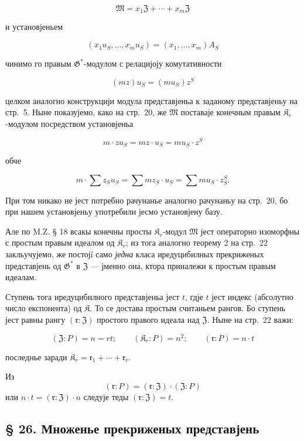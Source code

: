 \documentclass[11pt]{article}
\begin{document}
\[\mathfrak{M}=x_1\mathfrak{Z}+\cdots+x_m\mathfrak{Z}\]

и установјеньем

\[(x_1u_S,\ldots,x_mu_S)=(x_1,\ldots,x_m)A_S\]

чинимо го правым \(\mathfrak G^*\)-модулом с релацијоју комутативности

\[(mz) u_S = (mu_S) z^S\]

целком аналогно конструкцији модула представјеньа к заданому представјеньу на стр.~5. Ныне показујемо, како на стр.~20, же \(\mathfrak{M}\) поставаје конечным правым \(\mathfrak K_r\)-модулом посредством установјеньа

\[m \cdot z u_S = mz \cdot u_S = mu_S \cdot z^S\]

обче

\[m \cdot \sum z_S u_S = \sum m z_S \cdot u_S = \sum m u_S \cdot z_S^S.\]

При том никако не јест потребно рачунанье аналогно рачунаньу на стр.~20, бо при нашем установјеньу употребили јесмо установјену базу.

Але по M.Z. § 18 всакы конечны просты \(\mathfrak K_r\)-модул \(\mathfrak{M}\) јест операторно изоморфны с простым правым идеалом од \(\mathfrak K_r\); из тога аналогно теорему 2 на стр.~22 закльучујемо, же постојí само \emph{једна} класа иредуцибилных прекриженых представјень од \(\mathfrak{G}^*\) в \(\mathfrak Z\) --- јменно она, ктора приналежи к простым правым идеалам.

Ступень тога иредуцибилного представјеньа јест \(t\), гдје \(t\) јест индекс (абсолутно число експонента) од \(\mathfrak K\). То се достава простым считаньем рангов. Бо ступень јест равны рангу \((\mathfrak r:\mathfrak Z)\) простого правого идеала над \(\mathfrak Z\). Ныне на стр.~22 важи:

\[
(\mathfrak Z:P)=n=rt;\qquad (\mathfrak K_r:P)=n^2;\qquad (\mathfrak r:P)=n\cdot t
\]

последнье заради \(\mathfrak K_r = \mathfrak{r}_1 + \cdots + \mathfrak{r}_r\).

Из
\[(\mathfrak{r}: P) = (\mathfrak{r}: \mathfrak Z) \cdot (\mathfrak Z: P)\]
или \(n \cdot t = (\mathfrak{r}: \mathfrak Z) \cdot n\) следује теды \((\mathfrak{r}: \mathfrak Z) = t\).

\subsection*{§ 26. Множенье прекриженых представјень}\label{multiplikation-der-verschraenkten-darstellungen}
\end{document}
